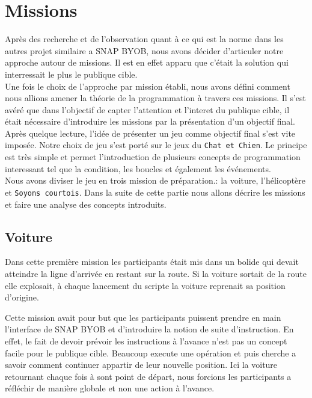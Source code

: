 \section{Missions}
Après des recherche et de l'observation quant à ce qui est la norme dans les autres projet similaire a SNAP BYOB, nous avons décider d'articuler notre approche autour de missions. Il est en effet apparu que c'était la solution qui interressait le plus le publique cible.\\

Une fois le choix de l'approche par mission établi, nous avons défini comment nous allions amener la théorie de la programmation à travers ces missions. Il s'est avéré que dans l'objectif de capter l'attention et l'interet du publique cible, il était nécessaire d'introduire les missions par la présentation d'un objectif final. Après quelque lecture, l'idée de présenter un jeu comme objectif final s'est vite imposée. Notre choix de jeu s'est porté sur le jeux du \texttt{Chat et Chien}. Le principe est très simple et permet l'introduction de plusieurs concepts de programmation interessant tel que la condition, les boucles et également les événements.\\

Nous avons diviser le jeu en trois mission de préparation.: la voiture, l'hélicoptère et \texttt{Soyons courtois}. Dans la suite de cette partie nous allons décrire les missions et faire une analyse des concepts introduits.

\subsection{Voiture}
Dans cette première mission les participants était mis dans un bolide qui devait atteindre la ligne d'arrivée en restant sur la route. Si la voiture sortait de la route elle explosait, à chaque lancement du scripte la voiture reprenait sa position d'origine.

Cette mission avait pour but que les participants puissent prendre en main l'interface de SNAP BYOB et d'introduire la notion de suite d'instruction. En effet, le fait de devoir prévoir les instructions à l'avance n'est pas un concept facile pour le publique cible. Beaucoup execute une opération et puis cherche a savoir comment continuer appartir de leur nouvelle position. Ici la voiture retournant chaque fois à sont point de départ, nous forcions les participants a réfléchir de manière globale et non une action à l'avance.

